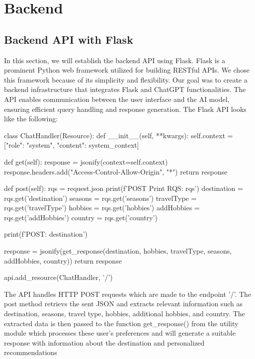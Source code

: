 \documentclass[english,notitlepage,smartquotes]{hgbreport}
\begin{document}

\section{Backend}

\subsection{Backend API with Flask}
In this section, we will establish the backend API using Flask. Flask is a prominent Python web framework utilized for building RESTful APIs. We chose this framework because of its simplicity and flexibility. Our goal was to create a backend infrastructure that integrates Flask and ChatGPT functionalities. The API enables communication between the user interface and the AI model, ensuring efficient query handling and response generation. The Flask API looks like the following:
\begin{PythonCode}
	class ChatHandler(Resource):
	def __init__(self, **kwargs):
	self.context = [{"role": "system", "content": system_context}]
	
	def get(self):
	response = jsonify(context=self.context)
	response.headers.add("Access-Control-Allow-Origin", "*")
	return response
	
	def post(self):
	rqs = request.json
	print(f'POST Print RQS: {rqs}\n')
	destination = rqs.get('destination')
	seasons = rqs.get('seasons')
	travelType = rqs.get('travelType')
	hobbies = rqs.get('hobbies')
	addHobbies = rqs.get('addHobbies')
	country = rqs.get('country')
	
	print(f'POST: {destination}\n')
	
	response = jsonify(get_response(destination, hobbies, travelType, seasons, addHobbies, country))
	return response
	
	
	api.add_resource(ChatHandler, '/')
\end{PythonCode}
The API handles HTTP POST requests which are made to the endpoint '/'. The post method retrievs the sent JSON and extracts relevant information such as destination, seasons, travel type, hobbies, additional hobbies, and country. The extracted data is then passed to the function get\_response() from the utility module which processes these user's preferences and will generate a suitable response with information about the destination and personalized recommendations
\end{document}
